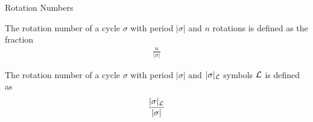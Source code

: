 \begin{frame}{Rotation Numbers}
	\vspace{-1em}
	\begin{definition}
		The rotation number of a cycle $\sigma$ with period $|\sigma|$ and $n$ rotations is defined as the fraction
		\begin{align*}
			\frac{n}{|\sigma|}
		\end{align*}
	\end{definition}
	\pause
	\begin{definition}
		The rotation number of a cycle $\sigma$ with period $|\sigma|$ and $|\sigma|_{\mathcal{L}}$ symbols $\mathcal{L}$ is defined as
		\begin{align*}
			\frac{|\sigma|_{\mathcal{L}}}{|\sigma|}
		\end{align*}
	\end{definition}
	\vspace{-3em}
	\begin{flushright}
		\cite{Keener80}
	\end{flushright}
\end{frame}

